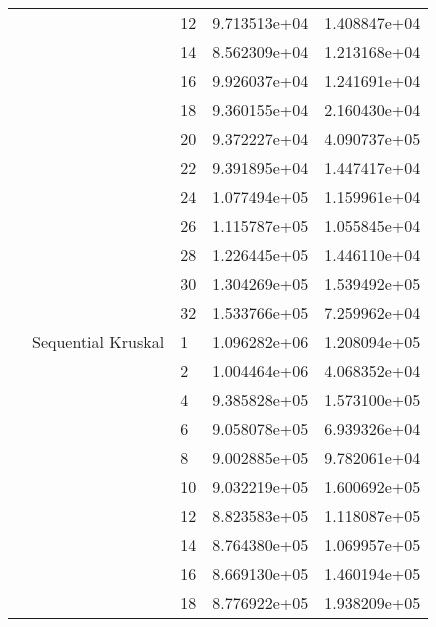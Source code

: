\begin{tabular}{lllrr}
                       &                    & 12 &  9.713513e+04 &  1.408847e+04 \\
                       &                    & 14 &  8.562309e+04 &  1.213168e+04 \\
                       &                    & 16 &  9.926037e+04 &  1.241691e+04 \\
                       &                    & 18 &  9.360155e+04 &  2.160430e+04 \\
                       &                    & 20 &  9.372227e+04 &  4.090737e+05 \\
                       &                    & 22 &  9.391895e+04 &  1.447417e+04 \\
                       &                    & 24 &  1.077494e+05 &  1.159961e+04 \\
                       &                    & 26 &  1.115787e+05 &  1.055845e+04 \\
                       &                    & 28 &  1.226445e+05 &  1.446110e+04 \\
                       &                    & 30 &  1.304269e+05 &  1.539492e+05 \\
                       &                    & 32 &  1.533766e+05 &  7.259962e+04 \\
                       & Sequential Kruskal & 1  &  1.096282e+06 &  1.208094e+05 \\
                       &                    & 2  &  1.004464e+06 &  4.068352e+04 \\
                       &                    & 4  &  9.385828e+05 &  1.573100e+05 \\
                       &                    & 6  &  9.058078e+05 &  6.939326e+04 \\
                       &                    & 8  &  9.002885e+05 &  9.782061e+04 \\
                       &                    & 10 &  9.032219e+05 &  1.600692e+05 \\
                       &                    & 12 &  8.823583e+05 &  1.118087e+05 \\
                       &                    & 14 &  8.764380e+05 &  1.069957e+05 \\
                       &                    & 16 &  8.669130e+05 &  1.460194e+05 \\
                       &                    & 18 &  8.776922e+05 &  1.938209e+05 \\

\end{tabular}

